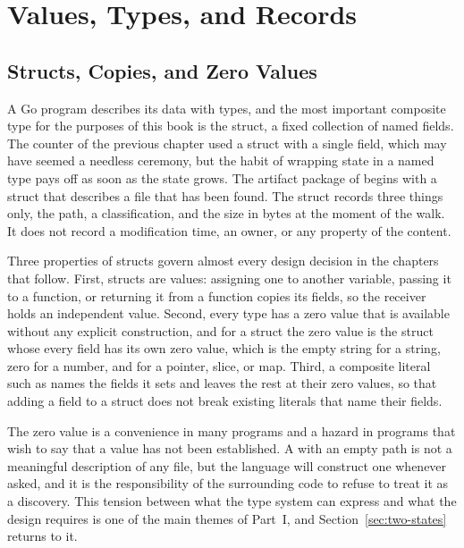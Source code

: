 \chapter{Values, Types, and Records}
\label{ch:types}

\section{Structs, Copies, and Zero Values}

A Go program describes its data with types, and the most important composite type for the purposes of this book is the struct, a fixed collection of named fields. The counter of the previous chapter used a struct with a single field, which may have seemed a needless ceremony, but the habit of wrapping state in a named type pays off as soon as the state grows. The artifact package of \golab{} begins with a struct that describes a file that has been found. The struct records three things only, the path, a classification, and the size in bytes at the moment of the walk. It does not record a modification time, an owner, or any property of the content.


Three properties of structs govern almost every design decision in the chapters that follow. First, structs are values: assigning one to another variable, passing it to a function, or returning it from a function copies its fields, so the receiver holds an independent value. Second, every type has a zero value that is available without any explicit construction, and for a struct the zero value is the struct whose every field has its own zero value, which is the empty string for a string, zero for a number, and  for a pointer, slice, or map. Third, a composite literal such as  names the fields it sets and leaves the rest at their zero values, so that adding a field to a struct does not break existing literals that name their fields.

The zero value is a convenience in many programs and a hazard in programs that wish to say that a value has not been established. A  with an empty path is not a meaningful description of any file, but the language will construct one whenever asked, and it is the responsibility of the surrounding code to refuse to treat it as a discovery. This tension between what the type system can express and what the design requires is one of the main themes of Part~I, and Section~\ref{sec:two-states} returns to it.

